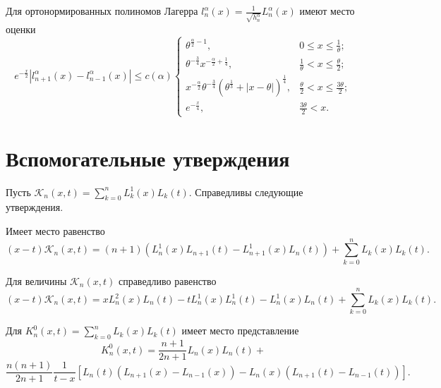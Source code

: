 Для ортонормированных полиномов Лагерра $l_n^\alpha(x)=\frac{1}{\sqrt{h_n^\alpha}}L_n^\alpha(x)$ имеют место оценки
\begin{equation*}\label{Gadzhimirzaev:orth-est}
e^{-\frac{x}{2}}|l_{n+1}^\alpha(x)-l_{n-1}^\alpha(x)|\le c(\alpha)
\begin{cases}
		\theta^{\frac{\alpha}{2}-1}, & 0\le x\le \frac{1}{\theta}; \\
		\theta^{-\frac34}x^{-\frac{\alpha}{2}+\frac14}, & \frac{1}{\theta}< x\le \frac{\theta}{2}; \\
		x^{-\frac{\alpha}{2}}\theta^{-\frac34}\left(\theta^{\frac13}+|x-\theta|\right)^{\frac14}, & \frac{\theta}{2}< x\le \frac{3\theta}{2}; \\
		e^{-\frac x4}, & \frac{3\theta}{2}<x.
\end{cases}
\end{equation*}

\section{Вспомогательные утверждения}

Пусть $\mathcal{K}_{n}(x,t)=\sum\limits_{k=0}^{n}L_k^1(x)L_k(t)$. Справедливы следующие утверждения.

\begin{lemma}
Имеет место равенство
\begin{equation*}\label{Gadzhimirzaev:ker}
(x-t)\mathcal{K}_{n}(x,t)=(n+1)\left(L^1_{n}(x)L_{n+1}(t)-L^1_{n+1}(x)L_{n}(t)\right)+\sum_{k=0}^{n}L_{k}(x)L_{k}(t).
\end{equation*}
\end{lemma}

\begin{lemma}
Для величины $\mathcal{K}_{n}(x,t)$ справедливо равенство
\begin{equation*}
(x-t)\mathcal{K}_{n}(x,t)=xL^2_{n}(x)L_{n}(t)-tL^1_{n}(x)L^1_{n}(t)-L^1_{n}(x)L_{n}(t)+\sum_{k=0}^{n}L_{k}(x)L_{k}(t).
\end{equation*}
\end{lemma}

\begin{lemma}
Для $K_{n}^0(x,t)=\sum\limits_{k=0}^{n}L_{k}(x)L_{k}(t)$ имеет место представление
$$
K_n^0(x,t)=\frac{n+1}{2n+1}L_{n}(x)L_{n}(t)+
$$
\begin{equation*}	
\frac{n(n+1)}{2n+1}\frac{1}{t-x}\left[L_{n}(t)\left(L_{n+1}(x)-L_{n-1}(x)\right)-L_{n}(x)\left(L_{n+1}(t)-L_{n-1}(t)\right)\right].
\end{equation*}
\end{lemma}

